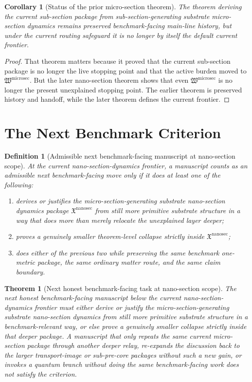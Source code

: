 \documentclass[11pt]{article}
\newcommand{\MicroSectionPackage}{\mathfrak W^{\mathrm{microsec}}}
\newcommand{\NanoSectionPackage}{\mathfrak X^{\mathrm{nanosec}}}
\newtheorem{definition}{Definition}
\newtheorem{corollary}{Corollary}
\newtheorem{theorem}{Theorem}
\begin{document}
\begin{corollary}[Status of the prior micro-section theorem]
The theorem deriving the current sub-section package from sub-section-generating substrate micro-section dynamics remains preserved benchmark-facing main-line history, but under the current routing safeguard it is no longer by itself the default current frontier.
\end{corollary}

\begin{proof}
That theorem matters because it proved that the current sub-section package is no longer the live stopping point and that the active burden moved to \(\MicroSectionPackage\). But the later nano-section theorem shows that even \(\MicroSectionPackage\) is no longer the present unexplained stopping point. The earlier theorem is preserved history and handoff, while the later theorem defines the current frontier.
\end{proof}

\section{The Next Benchmark Criterion}

\begin{definition}[Admissible next benchmark-facing manuscript at nano-section scope]
At the current nano-section-dynamics frontier, a manuscript counts as an admissible next benchmark-facing move only if it does at least one of the following:
\begin{enumerate}
    \item derives or justifies the micro-section-generating substrate nano-section dynamics package \(\NanoSectionPackage\) from still more primitive substrate structure in a way that does more than merely relocate the unexplained layer deeper;
    \item proves a genuinely smaller theorem-level collapse strictly inside \(\NanoSectionPackage\);
    \item does either of the previous two while preserving the same benchmark one-metric package, the same ordinary matter route, and the same claim boundary.
\end{enumerate}
\end{definition}

\begin{theorem}[Next honest benchmark-facing task at nano-section scope]
The next honest benchmark-facing manuscript below the current nano-section-dynamics frontier must either derive or justify the micro-section-generating substrate nano-section dynamics from still more primitive substrate structure in a benchmark-relevant way, or else prove a genuinely smaller collapse strictly inside that deeper package. A manuscript that only repeats the same current micro-section package through another deeper relay, re-expands the discussion back to the larger transport-image or sub-pre-core packages without such a new gain, or invokes a quantum branch without doing the same benchmark-facing work does not satisfy the criterion.
\end{theorem}
\end{document}
